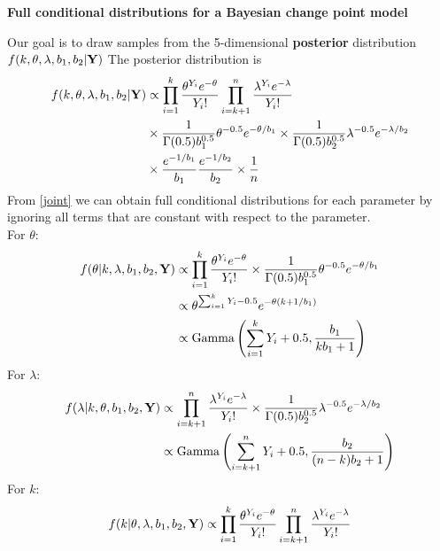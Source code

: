 \documentclass[11pt]{article}
\begin{document}
\pagestyle{empty}
\begin{center}
\Large
{\bf  Full conditional distributions for a Bayesian change point model}\\
\end{center}
Our goal is to draw samples from the 5-dimensional
{\bf posterior} distribution $f(k,\theta,\lambda,b_1,b_2| {\bf Y})$  The posterior distribution is 
\begin{equation}\label{joint}
\begin{split}
f(k,\theta,\lambda,b_1,b_2| {\bf Y}) & \propto \prod_{i=1}^k \frac{\theta^{Y_i} e^{-\theta}}{Y_i !} \prod_{i=k+1}^n \frac{\lambda^{Y_i} e^{-\lambda}}{Y_i !} \\
& \times  \frac{1}{\Gamma(0.5)b_1^{0.5}} \theta^{-0.5} e^{-\theta/b_1} \times \frac{1}{\Gamma(0.5)b_2^{0.5}} \lambda^{-0.5} e^{-\lambda/b_2}\\ 
& \times \frac{e^{-1/b_1}}{b_1} \frac{e^{-1/b_2}}{b_2} \times \frac{1}{n}%
\end{split}
\end{equation}
From \ref{joint} we can obtain full conditional distributions for each parameter by ignoring all terms that are constant with respect to the parameter.\\
For $\theta$:
\begin{equation}
\begin{split}
  f(\theta|k,\lambda,b_1,b_2,{\bf Y}) & \propto \prod_{i=1}^k
  \frac{\theta^{Y_i} e^{-\theta}}{Y_i !} \times
  \frac{1}{\Gamma(0.5)b_1^{0.5}} \theta^{-0.5} e^{-\theta/b_1}\\
  & \propto \theta^{\sum_{i=1}^k Y_i-0.5} e^{-\theta(k+ 1/b_1)}  \\
  & \propto \mbox{Gamma}\left(\sum_{i=1}^k Y_i + 0.5, \frac{b_1}{k b_1+1}\right)
\end{split}
\end{equation}
For $\lambda$:
\begin{equation}
\begin{split}
f(\lambda|k,\theta,b_1,b_2,{\bf Y}) & \propto \prod_{i=k+1}^n \frac{\lambda^{Y_i} e^{-\lambda}}{Y_i !} \times \frac{1}{\Gamma(0.5)b_2^{0.5}} \lambda^{-0.5} e^{-\lambda/b_2} \\
& \propto \mbox{Gamma}\left(\sum_{i=k+1}^n Y_i + 0.5, \frac{b_2}{(n-k) b_2+1}\right)
\end{split}
\end{equation}
For $k$:
\begin{equation}
f(k|\theta,\lambda,b_1,b_2,{\bf Y}) \propto \prod_{i=1}^k \frac{\theta^{Y_i} e^{-\theta}}{Y_i !} \prod_{i=k+1}^n \frac{\lambda^{Y_i} e^{-\lambda}}{Y_i !}
\end{equation}
\end{document}
